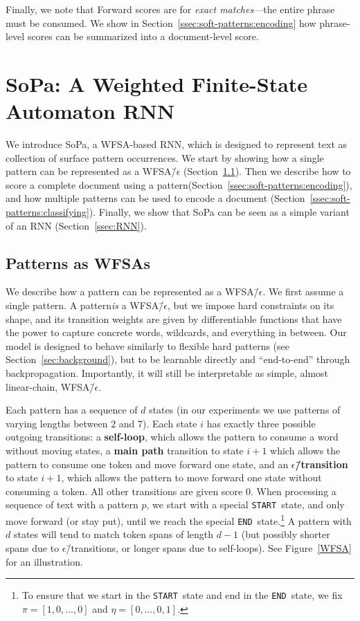\documentclass[11pt,a4paper]{article}
\newcommand{\isection}[2]{\section{#1}\label{sec:#2}}
\newcommand{\isubsection}[2]{\subsection{#1}\label{ssec:#2}}
\newcommand{\secref}[1]{Section~\ref{sec:#1}}
\newcommand{\subsecref}[1]{Section~\ref{ssec:#1}}
\newcommand{\figref}[1]{Figure~\ref{#1}}
\newcommand{\softp}{pattern\xspace}
\newcommand{\softps}{patterns\xspace}
\newcommand{\SoftP}{SoPa\xspace}
\newcommand{\StartState}{\texttt{START}}
\newcommand{\EndState}{\texttt{END}}
\newcommand{\term}[1]{\textbf{#1}} %
\newcommand{\happy}{main path\xspace}
\newcommand{\epstrans}{$\epsilon$\=/transition} %
\begin{document}
Finally, we note that Forward scores are for \emph{exact matches}---the entire phrase must be consumed.
We show in \subsecref{soft-patterns:encoding} how phrase-level scores can be summarized into a document-level score.





\isection{\SoftP: A Weighted Finite-State Automaton RNN}{soft-patterns}

We introduce \SoftP,  a WFSA-based RNN,
which is designed to represent text as collection of surface pattern occurrences. 
We start by showing how a single \softp can be represented as a WFSA\=/$\epsilon$ (\subsecref{soft-patterns:as_wfsas}).
Then we describe how to score a complete document using a \softp (\subsecref{soft-patterns:encoding}),
and how multiple \softps can be used to encode a document (\subsecref{soft-patterns:classifying}).
Finally, we show that \SoftP can be seen as a simple variant of an RNN (\subsecref{RNN}).



\isubsection{Patterns as WFSAs}{soft-patterns:as_wfsas}

We describe how a \softp can be represented as a WFSA\=/$\epsilon$.
We first assume a single \softp. 
A \softp \emph{is} a WFSA\=/$\epsilon$, but we impose hard constraints on its shape, and its transition weights are given by differentiable functions that have the power to capture concrete words, wildcards, and everything in between.
Our model is designed to behave similarly to  flexible hard
patterns (see \secref{background}), but to be learnable directly and ``end-to-end''
through backpropagation.
Importantly, it will still be interpretable as simple, almost linear-chain, WFSA\=/$\epsilon$.

Each pattern has a sequence of $d$ states (in our experiments we use patterns of varying lengths between 2 and 7).
Each state $i$ has exactly three possible outgoing transitions: a
\term{self-loop}, which allows the pattern to consume a word without
moving states, a \term{\happy}  transition to state $i+1$ which allows the
pattern to consume one token and move forward one state, and an
\term{\epstrans} to state $i+1$, which allows the pattern to move
forward one state without consuming a token.
All other transitions are given score 0.
When processing a sequence of text with a pattern $p$, we start with a special \StartState\ state, and only move forward (or stay put), until we reach the special \EndState\ state.\footnote{To ensure that we start in the \StartState\ state and end in the \EndState\ state, we fix $\pi=[1,0,\dots,0]$ and $\eta=[0,\dots,0,1]$.}
A pattern with $d$ states will tend to match token spans of length $d - 1$ (but possibly shorter spans due to \epstrans s, or longer spans due to self-loops).
See \figref{WFSA} for an illustration.
\end{document}

